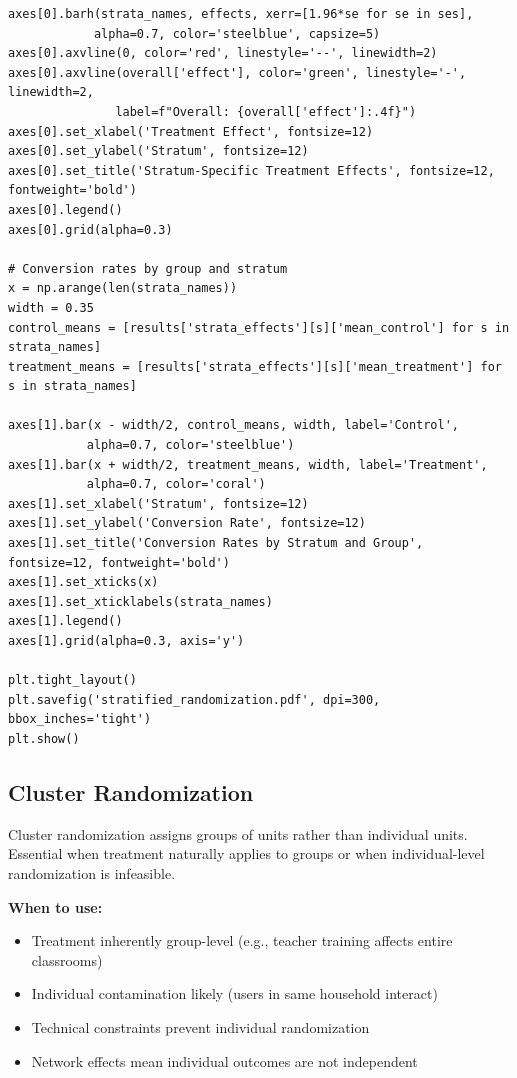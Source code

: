\begin{lstlisting}
axes[0].barh(strata_names, effects, xerr=[1.96*se for se in ses],
            alpha=0.7, color='steelblue', capsize=5)
axes[0].axvline(0, color='red', linestyle='--', linewidth=2)
axes[0].axvline(overall['effect'], color='green', linestyle='-', linewidth=2,
               label=f"Overall: {overall['effect']:.4f}")
axes[0].set_xlabel('Treatment Effect', fontsize=12)
axes[0].set_ylabel('Stratum', fontsize=12)
axes[0].set_title('Stratum-Specific Treatment Effects', fontsize=12, fontweight='bold')
axes[0].legend()
axes[0].grid(alpha=0.3)

# Conversion rates by group and stratum
x = np.arange(len(strata_names))
width = 0.35
control_means = [results['strata_effects'][s]['mean_control'] for s in strata_names]
treatment_means = [results['strata_effects'][s]['mean_treatment'] for s in strata_names]

axes[1].bar(x - width/2, control_means, width, label='Control',
           alpha=0.7, color='steelblue')
axes[1].bar(x + width/2, treatment_means, width, label='Treatment',
           alpha=0.7, color='coral')
axes[1].set_xlabel('Stratum', fontsize=12)
axes[1].set_ylabel('Conversion Rate', fontsize=12)
axes[1].set_title('Conversion Rates by Stratum and Group', fontsize=12, fontweight='bold')
axes[1].set_xticks(x)
axes[1].set_xticklabels(strata_names)
axes[1].legend()
axes[1].grid(alpha=0.3, axis='y')

plt.tight_layout()
plt.savefig('stratified_randomization.pdf', dpi=300, bbox_inches='tight')
plt.show()
\end{lstlisting}

\subsection{Cluster Randomization}

Cluster randomization assigns groups of units rather than individual units. Essential when treatment naturally applies to groups or when individual-level randomization is infeasible.

\textbf{When to use:}
\begin{itemize}
    \item Treatment inherently group-level (e.g., teacher training affects entire classrooms)
    \item Individual contamination likely (users in same household interact)
    \item Technical constraints prevent individual randomization
    \item Network effects mean individual outcomes are not independent
\end{itemize}

